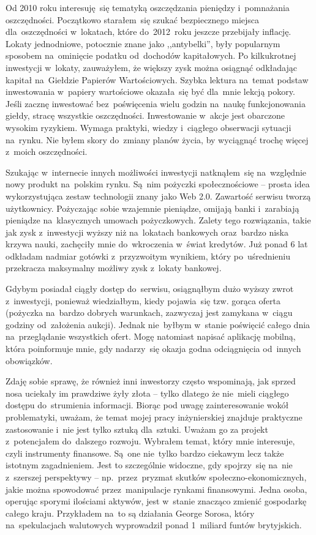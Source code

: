 \documentclass[a4paper,twoside,titlepage,openright]{book}
\begin{document}
Od 2010 roku interesuję~się tematyką oszczędzania pieniędzy i~pomnażania oszczędności. Początkowo starałem~się szukać bezpiecznego miejsca dla~oszczędności w~lokatach, które do~2012~roku jeszcze przebijały inflację. Lokaty jednodniowe, potocznie znane jako ,,antybelki'', były popularnym sposobem na~ominięcie podatku od~dochodów kapitałowych. Po kilkukrotnej inwestycji w~lokaty, zauważyłem, że większy zysk można osiągnąć odkładając kapitał na~Giełdzie Papierów Wartościowych. Szybka lektura na~temat podstaw inwestowania w~papiery wartościowe okazała~się być dla~mnie lekcją pokory. Jeśli zacznę inwestować bez~poświęcenia wielu godzin na~naukę funkcjonowania giełdy, stracę wszystkie oszczędności. Inwestowanie w~akcje jest obarczone wysokim ryzykiem. Wymaga praktyki, wiedzy i~ciągłego obserwacji sytuacji na~rynku. Nie byłem skory do~zmiany planów życia, by wyciągnąć trochę więcej z~moich oszczędności. 

Szukając w~internecie innych możliwości inwestycji natknąłem~się na~względnie nowy produkt na~polskim rynku. Są~nim pożyczki społecznościowe -- prosta idea wykorzystująca zestaw technologii znany jako Web 2.0. Zawartość serwisu tworzą użytkownicy. Pożyczając sobie wzajemnie pieniądze, omijają banki i~zarabiają pieniądze na~klasycznych umowach pożyczkowych. Zalety tego rozwiązania, takie jak zysk z~inwestycji wyższy niż na~lokatach bankowych oraz~bardzo niska krzywa nauki, zachęciły mnie do~wkroczenia w~świat kredytów. Już ponad 6 lat odkładam nadmiar gotówki z~przyzwoitym wynikiem, który po~uśrednieniu przekracza maksymalny możliwy zysk z~lokaty bankowej. 

Gdybym posiadał ciągły dostęp do~serwisu, osiągnąłbym dużo wyższy zwrot z~inwestycji, ponieważ wiedziałbym, kiedy pojawia~się tzw. gorąca oferta (pożyczka na~bardzo dobrych warunkach, zazwyczaj jest zamykana w~ciągu godziny od~założenia aukcji). Jednak nie~byłbym w~stanie poświęcić całego dnia na~przeglądanie wszystkich ofert. Mogę natomiast napisać aplikację mobilną, która poinformuje mnie, gdy nadarzy~się okazja godna odciągnięcia od~innych obowiązków. 

Zdaję sobie sprawę, że również inni inwestorzy często wspominają, jak sprzed nosa uciekały im prawdziwe żyły złota -- tylko dlatego że nie~mieli ciągłego dostępu do~strumienia informacji. Biorąc pod uwagę zainteresowanie wokół problematyki, uważam, że temat mojej pracy inżynierskiej znajduje praktyczne zastosowanie i~nie jest tylko sztuką dla~sztuki. Uważam go za projekt z~potencjałem do~dalszego rozwoju. Wybrałem temat, który mnie interesuje, czyli instrumenty finansowe. Są~one nie~tylko bardzo ciekawym lecz także istotnym zagadnieniem. Jest to szczególnie widoczne, gdy spojrzy~się na~nie z~szerszej perspektywy -- np.~przez~pryzmat skutków społeczno-ekonomicznych, jakie można spowodować przez~manipulacje rynkami finansowymi. Jedna osoba, operując sporymi ilościami aktywów, jest w~stanie znacząco zmienić gospodarkę całego kraju. Przykładem na~to są działania George Sorosa, który na~spekulacjach walutowych wyprowadził ponad 1~miliard funtów brytyjskich.\cite{soros}
\end{document}
